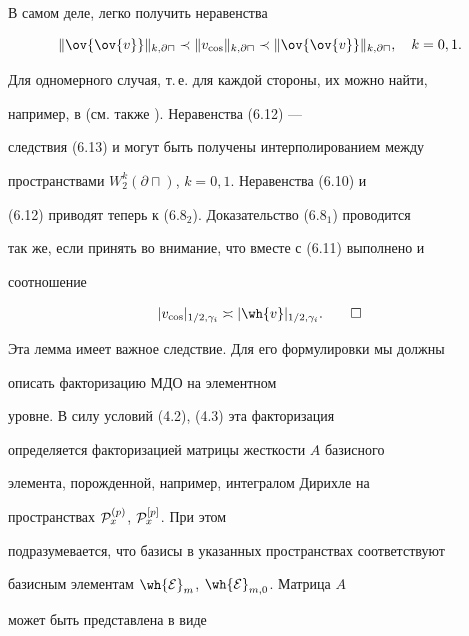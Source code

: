 В самом деле, легко получить неравенства


\begin{equation}\label{eq6.13}


\|\ov{\ov{v}}\|_{k,\partial\sqcap} \prec


\|v_{\cos}\|_{k,\partial\sqcap} \prec


\|\ov{\ov{v}}\|_{k,\partial\sqcap}, \quad k=0,1.


\end{equation}


Для одномерного случая, т.\,е. для каждой стороны, их можно найти, 


например, в \cite{bah-kor} (см. также \cite{iva-kor1}). Неравенства (6.12) ---


следствия (6.13) и могут быть получены интерполированием между 


пространствами $W^k_2(\partial\sqcap)$, $k=0,1$. Неравенства (6.10) и 


(6.12) приводят теперь к (6.8$_2$). Доказательство (6.8$_1$) проводится


так же, если принять во внимание, что вместе с (6.11) выполнено и 


соотношение 


\begin{equation}\label{eq6.14}


|v_{\cos}|_{1/2,\gamma_i} \asymp |\wh{v}|_{1/2,\gamma_i}.\qquad\square


\end{equation}


\smallskip





Эта лемма имеет важное следствие. Для его формулировки мы должны


описать факторизацию МДО на элементном 


уровне. В силу условий (4.2), (4.3) эта факторизация 


определяется факторизацией матрицы жесткости $A$ базисного 


элемента, порожденной, например, интегралом Дирихле на


пространствах ${\cal P}^{(p)}_x$, ${\cal P}^{[p]}_x$. При этом 


подразумевается, что базисы в указанных пространствах соответствуют 


базисным элементам $\wh{{\cal E}}_m$, $\wh{{\cal E}}_{m,0}$. Матрица $A$ 


может быть представлена в виде 


